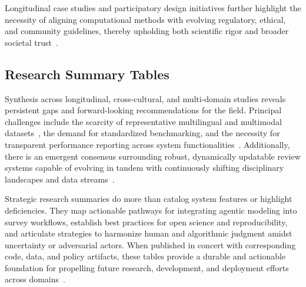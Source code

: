 \documentclass[sigconf]{acmart}
\begin{document}
Longitudinal case studies and participatory design initiatives further highlight the necessity of aligning computational methods with evolving regulatory, ethical, and community guidelines, thereby upholding both scientific rigor and broader societal trust~\cite{ref106}\cite{ref111}\cite{ref117}.

\subsection{Research Summary Tables}

Synthesis across longitudinal, cross-cultural, and multi-domain studies reveals persistent gaps and forward-looking recommendations for the field. Principal challenges include the scarcity of representative multilingual and multimodal datasets~\cite{ref108,ref110}, the demand for standardized benchmarking, and the necessity for transparent performance reporting across system functionalities~\cite{ref113,ref114}. Additionally, there is an emergent consensus surrounding robust, dynamically updatable review systems capable of evolving in tandem with continuously shifting disciplinary landscapes and data streams~\cite{ref114,ref115,ref117}.

Strategic research summaries do more than catalog system features or highlight deficiencies. They map actionable pathways for integrating agentic modeling into survey workflows, establish best practices for open science and reproducibility, and articulate strategies to harmonize human and algorithmic judgment amidst uncertainty or adversarial actors. When published in concert with corresponding code, data, and policy artifacts, these tables provide a durable and actionable foundation for propelling future research, development, and deployment efforts across domains~\cite{ref113,ref114,ref115,ref117}.
\end{document}
